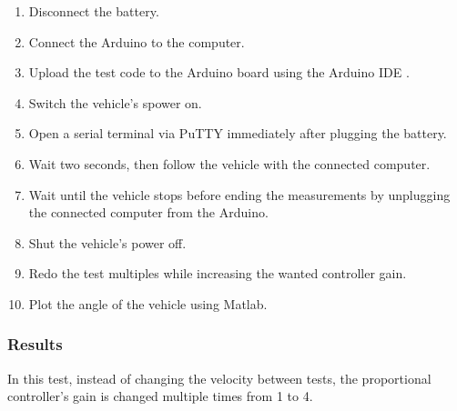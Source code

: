 \begin{enumerate}
  \item Disconnect the battery.
  \item Connect the Arduino to the computer.
  \item Upload the test code to the Arduino board using the Arduino IDE  \cite{ArduinoIDE}.
  \item Switch the vehicle's spower on.
  \item Open a serial terminal via PuTTY \cite{PuTTY} immediately after plugging the battery.
  \item Wait two seconds, then follow the vehicle with the connected computer.
  \item Wait until the vehicle stops before ending the measurements by unplugging the connected computer from the Arduino.
  \item Shut the vehicle's power off.
  \item Redo the test multiples while increasing the wanted controller gain.
  \item Plot the angle of the vehicle using Matlab.
\end{enumerate}

\subsubsection{Results}

In this test, instead of changing the velocity between tests, the proportional controller's gain is changed multiple times from 1 to 4.\\

